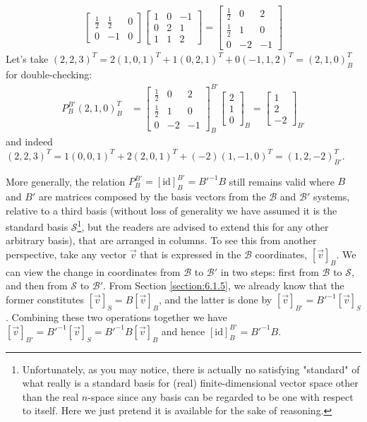 \begin{solution}
\begin{align*}
\begin{bmatrix}
\frac{1}{2} & \frac{1}{2} & 0 \\
0 & -1 & 0
\end{bmatrix}
\begin{bmatrix}
1 & 0 & -1\\
0 & 2 & 1 \\
1 & 1 & 2
\end{bmatrix}
=
\begin{bmatrix}
\frac{1}{2} & 0 & 2 \\
\frac{1}{2} & 1 & 0 \\
0 & -2 & -1
\end{bmatrix}
\end{align*}
Let's take $(2,2,3)^T = 2(1,0,1)^T + 1(0,2,1)^T + 0(-1,1,2)^T = (2,1,0)^T_B$ for double-checking:
\begin{align*}
P_B^{B'}(2,1,0)^T_B &= 
\begin{bmatrix}
\frac{1}{2} & 0 & 2 \\
\frac{1}{2} & 1 & 0 \\
0 & -2 & -1
\end{bmatrix}_B^{B'}
\begin{bmatrix}
2 \\
1 \\
0
\end{bmatrix}_B
=
\begin{bmatrix}
1 \\
2 \\
-2
\end{bmatrix}_{B'}
\end{align*}
and indeed $(2,2,3)^T = 1(0,0,1)^T + 2(2,0,1)^T + (-2)(1,-1,0)^T = (1,2,-2)^T_{B'}$.
\end{solution}
More generally, the relation $P_B^{B'} = [\text{id}]_B^{B'} = B'^{-1}B$ still remains valid where $B$ and $B'$ are matrices composed by the basis vectors from the $\mathcal{B}$ and $\mathcal{B}'$ systems, relative to a third basis (without loss of generality we have assumed it is the standard basis $\mathcal{S}$\footnote{Unfortunately, as you may notice, there is actually no satisfying "standard" of what really is a standard basis for (real) finite-dimensional vector space other than the real $n$-space since any basis can be regarded to be one with respect to itself. Here we just pretend it is available for the sake of reasoning.}, but the readers are advised to extend this for any other arbitrary basis), that are arranged in columns. To see this from another perspective, take any vector $\vec{v}$ that is expressed in the $\mathcal{B}$ coordinates, $[\vec{v}]_B$. We can view the change in coordinates from $\mathcal{B}$ to $\mathcal{B}'$ in two steps: first from $\mathcal{B}$ to $\mathcal{S}$, and then from $\mathcal{S}$ to $\mathcal{B}'$. From Section \ref{section:6.1.5}, we already know that the former constitutes $[\vec{v}]_S = B[\vec{v}]_B$, and the latter is done by $[\vec{v}]_{B'} = B'^{-1}[\vec{v}]_S$. Combining these two operations together we have $[\vec{v}]_{B'} = B'^{-1}[\vec{v}]_S = B'^{-1}B[\vec{v}]_B$ and hence $[\text{id}]_B^{B'} = B'^{-1}B$.


